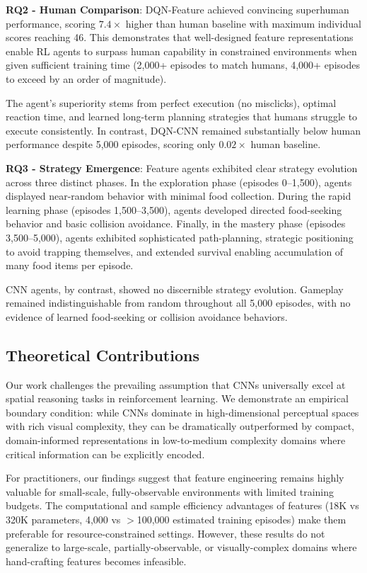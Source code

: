 \documentclass[10pt,a4paper,twocolumn]{article}
\begin{document}
\textbf{RQ2 - Human Comparison}: DQN-Feature achieved convincing superhuman performance, scoring $7.4\times$ higher than human baseline with maximum individual scores reaching 46. This demonstrates that well-designed feature representations enable RL agents to surpass human capability in constrained environments when given sufficient training time (2,000+ episodes to match humans, 4,000+ episodes to exceed by an order of magnitude). 

The agent's superiority stems from perfect execution (no misclicks), optimal reaction time, and learned long-term planning strategies that humans struggle to execute consistently. In contrast, DQN-CNN remained substantially below human performance despite 5,000 episodes, scoring only $0.02\times$ human baseline.

\textbf{RQ3 - Strategy Emergence}: Feature agents exhibited clear strategy evolution across three distinct phases. In the exploration phase (episodes 0--1,500), agents displayed near-random behavior with minimal food collection. During the rapid learning phase (episodes 1,500--3,500), agents developed directed food-seeking behavior and basic collision avoidance. Finally, in the mastery phase (episodes 3,500--5,000), agents exhibited sophisticated path-planning, strategic positioning to avoid trapping themselves, and extended survival enabling accumulation of many food items per episode.

CNN agents, by contrast, showed no discernible strategy evolution. Gameplay remained indistinguishable from random throughout all 5,000 episodes, with no evidence of learned food-seeking or collision avoidance behaviors.

\subsection{Theoretical Contributions}

Our work challenges the prevailing assumption that CNNs universally excel at spatial reasoning tasks in reinforcement learning. We demonstrate an empirical boundary condition: while CNNs dominate in high-dimensional perceptual spaces with rich visual complexity, they can be dramatically outperformed by compact, domain-informed representations in low-to-medium complexity domains where critical information can be explicitly encoded.

For practitioners, our findings suggest that feature engineering remains highly valuable for small-scale, fully-observable environments with limited training budgets. The computational and sample efficiency advantages of features (18K vs 320K parameters, 4,000 vs $>$100,000 estimated training episodes) make them preferable for resource-constrained settings. However, these results do not generalize to large-scale, partially-observable, or visually-complex domains where hand-crafting features becomes infeasible.
\end{document}
